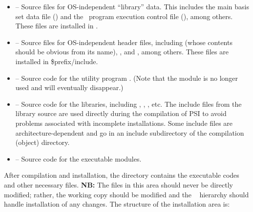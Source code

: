 \begin{itemize}
\item {} -- Source files for
  OS-independent ``library'' data.  This includes the main basis set
  data file () and the \PSIthree\ program execution
  control file (), among others.  These files are
  installed in .

\item {} -- Source files for
  OS-independent header files, including  (whose
  contents should be obvious from its name), , and
  , among others.  These files are installed in
  \$prefix/include.

\item {} -- Source code for the utility
  program .  (Note that the  module is
  no longer used and will eventually disappear.)

\item {} -- Source code for the
  libraries, including , ,
  , etc.  The include files from the library
  source are used directly during the compilation of PSI to 
  avoid problems associated with incomplete installations.  Some
  include files are architecture-dependent and go in an include
  subdirectory of the compilation (object) directory.

\item {} -- Source code for the
  executable modules.
\end{itemize}

After compilation and installation, the  directory
contains the executable codes and other necessary files.  {\bf NB:}
The files in this area should never be directly modified; rather, the
working copy should be modified and the \PSIthree\ 
hierarchy should handle installation of any changes.  The structure of
the installation area is:

